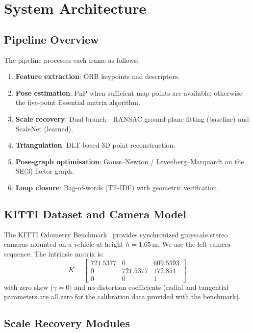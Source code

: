 \documentclass[12pt,a4paper]{article}
\begin{document}
\section{System Architecture}

\subsection{Pipeline Overview}

The pipeline processes each frame as follows:
\begin{enumerate}
    \item \textbf{Feature extraction}: ORB keypoints and descriptors.
    \item \textbf{Pose estimation}: PnP when sufficient map points are available; otherwise the five-point Essential matrix algorithm.
    \item \textbf{Scale recovery}: Dual branch---RANSAC ground-plane fitting (baseline) and ScaleNet (learned).
    \item \textbf{Triangulation}: DLT-based 3D point reconstruction.
    \item \textbf{Pose-graph optimisation}: Gauss--Newton / Levenberg--Marquardt on the SE(3) factor graph.
    \item \textbf{Loop closure}: Bag-of-words (TF-IDF) with geometric verification.
\end{enumerate}

\subsection{KITTI Dataset and Camera Model}

The KITTI Odometry Benchmark~\cite{Geiger2012} provides synchronized grayscale stereo cameras mounted on a vehicle at height $h = 1.65$\,m. We use the left camera sequence. The intrinsic matrix is:
\begin{equation}
    K = \begin{bmatrix}
    721.5377 & 0 & 609.5593 \\
    0 & 721.5377 & 172.854 \\
    0 & 0 & 1
    \end{bmatrix}
\end{equation}
with zero skew ($\gamma = 0$) and no distortion coefficients (radial and tangential parameters are all zero for the calibration data provided with the benchmark).

\subsection{Scale Recovery Modules}
\end{document}
